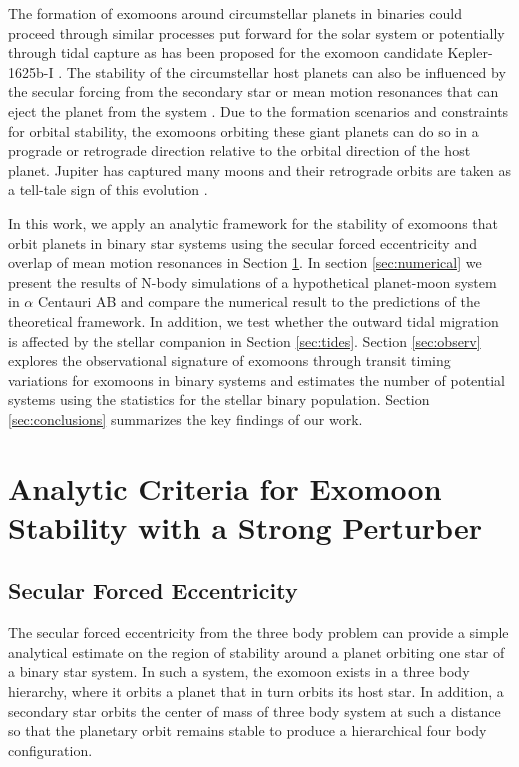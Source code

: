 \documentclass[preprint]{aastex63}
\begin{document}
The formation of exomoons around circumstellar planets in binaries could proceed through similar processes put forward for the solar system \citep[i.e.,][]{Canup2006} or potentially through tidal capture as has been proposed for the exomoon candidate Kepler-1625b-I \citep{Hamers2018b}.  The stability of the circumstellar host planets can also be influenced {by} the secular forcing from the secondary star \citep{andrade2017secular} or mean motion resonances that can eject the planet from the system \citep{Quarles2020}.  Due to the formation scenarios and constraints for orbital stability, the exomoons orbiting these giant planets can do so in a prograde or retrograde direction relative to the orbital direction of the host planet.  Jupiter has captured many moons and their retrograde orbits are taken as a tell-tale sign of this evolution \citep{Jewitt2007}. 

In this work, we apply an analytic framework for the stability of exomoons that orbit planets in binary star systems using the secular forced eccentricity and overlap of mean motion resonances in Section \ref{sec:analytic}. In section \ref{sec:numerical} we present the results of N-body simulations of a hypothetical planet-moon system in $\alpha$ Centauri AB and compare the numerical result to the predictions of the theoretical framework.  In addition, we test whether the outward tidal migration is affected by the stellar companion in Section \ref{sec:tides}.  Section \ref{sec:observ} explores the observational signature of exomoons through transit timing variations for exomoons in binary systems and estimates the number of potential systems using the statistics for the stellar binary population.  Section \ref{sec:conclusions} summarizes the key findings of our work.

\section{Analytic Criteria for Exomoon Stability with a Strong Perturber}\label{sec:analytic}
\subsection{Secular Forced Eccentricity}
The secular forced eccentricity from the three body problem can provide a simple analytical estimate on the region of stability around a planet orbiting one star of a binary star system. In such a system, the exomoon exists in a three body hierarchy, where it orbits a planet that in turn orbits its host star. In addition, a secondary star orbits the center of mass of three body system at such a distance so that the planetary orbit remains stable to produce a hierarchical four body configuration. 
\end{document}
